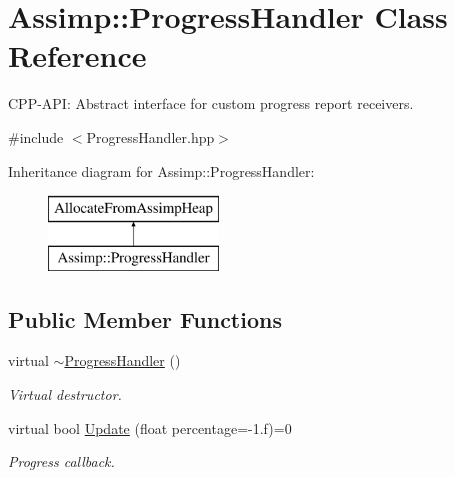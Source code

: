 \hypertarget{class_assimp_1_1_progress_handler}{}\section{Assimp\+:\+:Progress\+Handler Class Reference}
\label{class_assimp_1_1_progress_handler}


C\+P\+P-\/\+A\+PI\+: Abstract interface for custom progress report receivers.  




{\ttfamily \#include $<$Progress\+Handler.\+hpp$>$}

Inheritance diagram for Assimp\+:\+:Progress\+Handler\+:\begin{figure}[H]
\begin{center}
\leavevmode
\includegraphics[height=2.000000cm]{class_assimp_1_1_progress_handler}
\end{center}
\end{figure}
\subsection*{Public Member Functions}
\begin{DoxyCompactItemize}
\item 
virtual \hyperlink{class_assimp_1_1_progress_handler_a3ec465a62e1feaae00f585ca0cffb81e}{$\sim$\+Progress\+Handler} ()\hypertarget{class_assimp_1_1_progress_handler_a3ec465a62e1feaae00f585ca0cffb81e}{}\label{class_assimp_1_1_progress_handler_a3ec465a62e1feaae00f585ca0cffb81e}

\begin{DoxyCompactList}\small\item\em Virtual destructor. \end{DoxyCompactList}\item 
virtual bool \hyperlink{class_assimp_1_1_progress_handler_ab08a1d300d434f6dd86ca41747cba448}{Update} (float percentage=-\/1.f)=0
\begin{DoxyCompactList}\small\item\em Progress callback. \end{DoxyCompactList}\end{DoxyCompactItemize}

